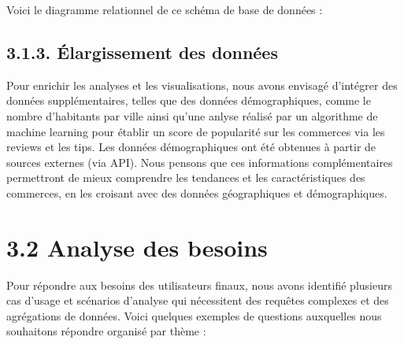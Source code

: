 Voici le diagramme relationnel de ce schéma de base de données :



\subsection*{3.1.3. Élargissement des données}

Pour enrichir les analyses et les visualisations, nous avons envisagé d’intégrer des données supplémentaires, telles que des données démographiques, comme le nombre d'habitants par ville ainsi qu'une anlyse réalisé par un algorithme de machine learning pour établir un score de popularité sur les commerces via les reviews et les tips.
Les données démographiques ont été obtenues à partir de sources externes (via API).
Nous pensons que ces informations complémentaires permettront de mieux comprendre les tendances et les caractéristiques des commerces, en les croisant avec des données géographiques et démographiques.


\section*{3.2 Analyse des besoins}

Pour répondre aux besoins des utilisateurs finaux, nous avons identifié plusieurs cas d’usage et scénarios d’analyse qui nécessitent des requêtes complexes et des agrégations de données.
Voici quelques exemples de questions auxquelles nous souhaitons répondre organisé par thème :

